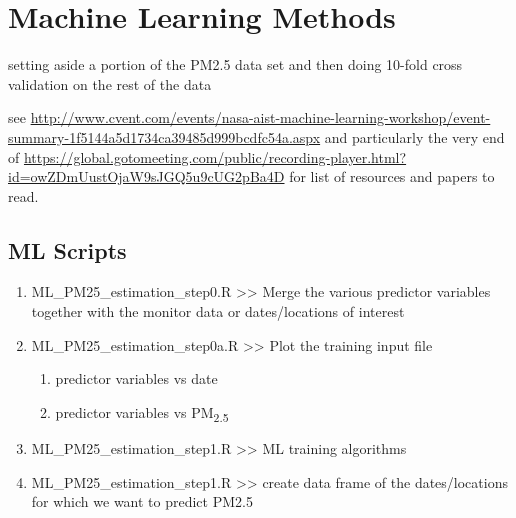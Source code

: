 \section{Machine Learning Methods}

setting aside a portion of the PM2.5 data set and then doing 10-fold cross validation on the rest of the data

see \url{http://www.cvent.com/events/nasa-aist-machine-learning-workshop/event-summary-1f5144a5d1734ca39485d999bcdfc54a.aspx} and particularly the very end of \url{https://global.gotomeeting.com/public/recording-player.html?id=owZDmUustOjaW9sJGQ5u9cUG2pBa4D} for list of resources and papers to read.


\subsection{ML Scripts}

\begin{enumerate}

\item ML\_PM25\_estimation\_step0.R >>  Merge the various predictor variables together with the monitor data or dates/locations of interest

\item ML\_PM25\_estimation\_step0a.R >> Plot the training input file
	\begin{enumerate}
		\item predictor variables vs date
		\item predictor variables vs PM\textsubscript{2.5}
	\end{enumerate}

\item ML\_PM25\_estimation\_step1.R >> ML training algorithms

\item ML\_PM25\_estimation\_step1.R >> create data frame of the dates/locations for which we want to predict PM2.5

\end{enumerate}